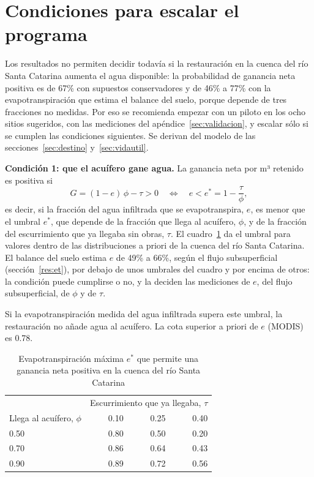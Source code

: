\documentclass[11pt,letterpaper]{article}
\begin{document}
\section{Condiciones para escalar el programa}\label{sec:escalar}

Los resultados no permiten decidir todavía si la restauración en la cuenca del río Santa Catarina aumenta el agua disponible: la probabilidad de ganancia neta positiva es de 67\% con supuestos conservadores y de 46\% a 77\% con la evapotranspiración que estima el balance del suelo, porque depende de tres fracciones no medidas. Por eso se recomienda empezar con un piloto en los ocho sitios sugeridos, con las mediciones del apéndice~\ref{sec:validacion}, y escalar sólo si se cumplen las condiciones siguientes. Se derivan del modelo de las secciones~\ref{sec:destino} y~\ref{sec:vidautil}.

\textbf{Condición 1: que el acuífero gane agua.} La ganancia neta por m³ retenido es positiva si
\begin{equation}
G=(1-e)\,\phi-\tau>0 \quad\Longleftrightarrow\quad e<e^\ast=1-\frac{\tau}{\phi},
\end{equation}
es decir, si la fracción del agua infiltrada que se evapotranspira, $e$, es menor que el umbral $e^\ast$, que depende de la fracción que llega al acuífero, $\phi$, y de la fracción del escurrimiento que ya llegaba sin obras, $\tau$. El cuadro~\ref{tab:escalar} da el umbral para valores dentro de las distribuciones a priori de la cuenca del río Santa Catarina. El balance del suelo estima $e$ de 49\% a 66\%, según el flujo subsuperficial (sección~\ref{res:et}), por debajo de unos umbrales del cuadro y por encima de otros: la condición puede cumplirse o no, y la deciden las mediciones de $e$, del flujo subsuperficial, de $\phi$ y de $\tau$.

\begin{table}[H]\centering\small
\caption{Evapotranspiración máxima $e^\ast$ que permite una ganancia neta positiva en la cuenca del río Santa Catarina}\label{tab:escalar}
{\color{gris}Si la evapotranspiración medida del agua infiltrada supera este umbral, la restauración no añade agua al acuífero. La cota superior a priori de $e$ (MODIS) es 0.78.\par}\smallskip
\begin{tabular}{lrrr}
\toprule
 & \multicolumn{3}{c}{Escurrimiento que ya llegaba, $\tau$} \\
Llega al acuífero, $\phi$ & 0.10 & 0.25 & 0.40 \\
\midrule
0.50 & 0.80 & 0.50 & 0.20 \\
0.70 & 0.86 & 0.64 & 0.43 \\
0.90 & 0.89 & 0.72 & 0.56 \\
\bottomrule
\end{tabular}
\end{table}
\end{document}
